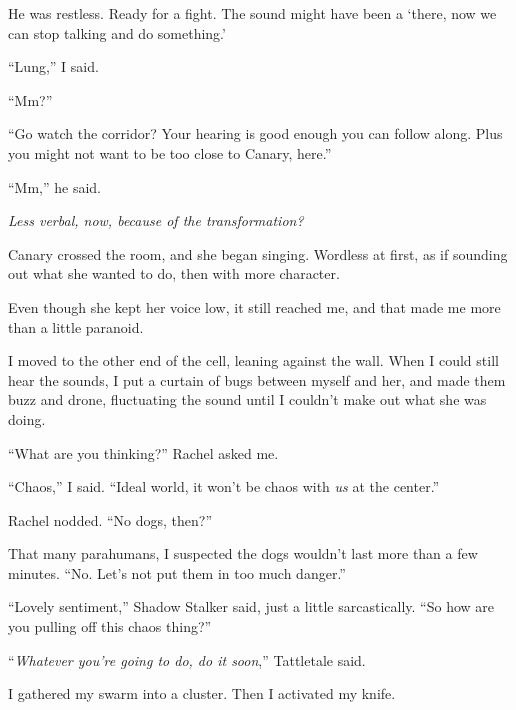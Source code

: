He was restless.  Ready for a fight.  The sound might have been a `there, now we can stop talking and do something.'



``Lung,'' I said.



``Mm?''



``Go watch the corridor?  Your hearing is good enough you can follow along.  Plus you might not want to be too close to Canary, here.''



``Mm,'' he said.



\emph{Less verbal, now, because of the transformation?}



Canary crossed the room, and she began singing.  Wordless at first, as if sounding out what she wanted to do, then with more character.



Even though she kept her voice low, it still reached me, and that made me more than a little paranoid.



I moved to the other end of the cell, leaning against the wall.  When I could still hear the sounds, I put a curtain of bugs between myself and her, and made them buzz and drone, fluctuating the sound until I couldn't make out what she was doing.



``What are you thinking?'' Rachel asked me.



``Chaos,'' I said.  ``Ideal world, it won't be chaos with \emph{us} at the center.''



Rachel nodded.  ``No dogs, then?''



That many parahumans, I suspected the dogs wouldn't last more than a few minutes.  ``No.  Let's not put them in too much danger.''



``Lovely sentiment,'' Shadow Stalker said, just a little sarcastically.  ``So how are you pulling off this chaos thing?''



``\emph{Whatever you're going to do, do it soon},'' Tattletale said.



I gathered my swarm into a cluster.  Then I activated my knife.



